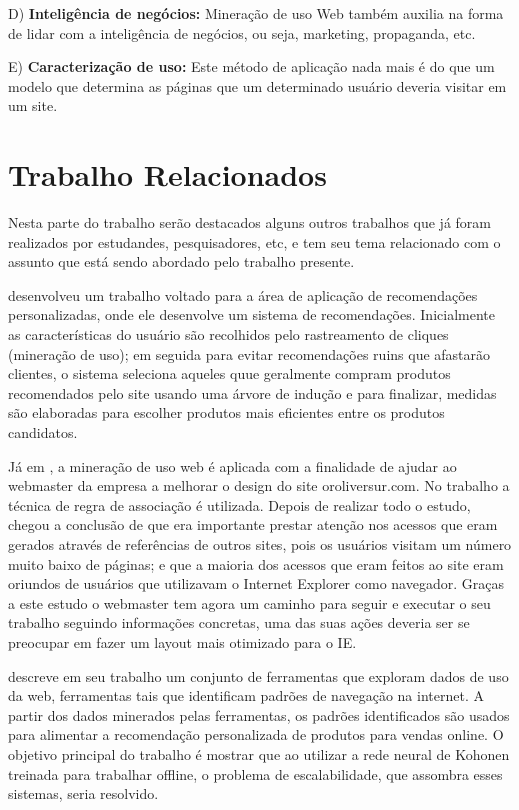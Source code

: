 D) \textbf{Inteligência de negócios:}
    Mineração de uso Web também auxilia na forma de lidar com a inteligência de negócios, ou seja, marketing, propaganda, etc.

E) \textbf{Caracterização de uso:}
    Este método de aplicação nada mais é do que um modelo que determina as páginas que um determinado usuário deveria visitar em um site.

\section{Trabalho Relacionados}
    Nesta parte do trabalho serão destacados alguns outros trabalhos que já foram realizados por estudandes, pesquisadores, etc, e tem seu tema relacionado com o assunto que está sendo abordado pelo trabalho presente.

    \cite{HoCho} desenvolveu um trabalho voltado para a área de aplicação de recomendações personalizadas, onde ele desenvolve um sistema de recomendações. Inicialmente as características do usuário são recolhidos pelo rastreamento de cliques (mineração de uso); em seguida para evitar recomendações ruins que afastarão clientes, o sistema seleciona aqueles quue geralmente compram produtos recomendados pelo site usando uma árvore de indução e para finalizar, medidas são elaboradas para escolher produtos mais eficientes entre os produtos candidatos.

    Já em \cite{Carmona}, a mineração de uso web é aplicada com a finalidade de ajudar ao webmaster da empresa a melhorar o design do site oroliversur.com. No trabalho a técnica de regra de associação é utilizada. Depois de realizar todo o estudo, \cite{Carmona} chegou a conclusão de que era importante prestar atenção nos acessos que eram gerados através de referências de outros sites, pois os usuários visitam um número muito baixo de páginas; e que a maioria dos acessos que eram feitos ao site eram oriundos de usuários que utilizavam o Internet Explorer como navegador. Graças a este estudo o webmaster tem agora um caminho para seguir e executar o seu trabalho seguindo informações concretas, uma das suas ações deveria ser se preocupar em fazer um layout mais otimizado para o IE.

    \cite{Zang} descreve em seu trabalho um conjunto de ferramentas que exploram dados de uso da web, ferramentas tais que identificam padrões de navegação na internet. A partir dos dados minerados pelas ferramentas, os padrões identificados são usados para alimentar a recomendação personalizada de produtos para vendas online. O objetivo principal do trabalho é mostrar que ao utilizar a rede neural de Kohonen treinada para trabalhar offline, o problema de escalabilidade, que assombra esses sistemas, seria resolvido.

